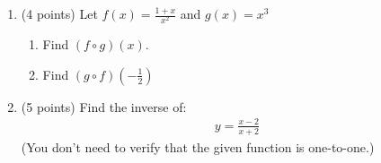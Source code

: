 \documentclass[11pt]{article}
\begin{document}
\begin{enumerate}
    \newpage

    \item (4 points) Let $f(x) = \displaystyle \frac{1+x}{x^2}$ and $g(x) = x^3$
    \vspace{0.2in}
        \begin{enumerate}
            \item Find $(f \circ g)(x)$.
                \vspace{3.8in}
            \item Find $(g \circ f)( -\frac{1}{2})$
        \end{enumerate}

    \newpage

    \item (5 points) Find the inverse of:
    \begin{equation*}
    \begin{split}
        y = \frac{x-2}{x+2}
    \end{split}
    \end{equation*}
    (You don't need to verify that the given function is one-to-one.)
    
\end{enumerate}
\end{document}
